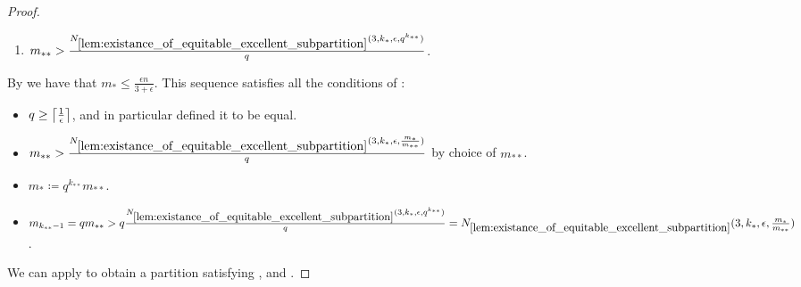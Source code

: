 \begin{theorem}[Theorem 5.18]
\begin{proof}
\begin{enumerate}[label=(\alph*), ref=\alph*]
                    \item \label{itm:minimal_conditions_for_excellent_partitions.c} $m_{**} > \frac{N_{\ref{lem:existance_of_equitable_excellent_subpartition}}
                        ( 3, k_*, \epsilon, q^{k_{**}} )}{q}$.
                \end{enumerate}
                By  we have that $m_* \leq \frac{\epsilon n}{3 + \epsilon}$.
                This sequence satisfies all the conditions of :
                \begin{itemize}[label={}]
                    \item {}
                        $q \geq \left\lceil \frac{1}{\epsilon} \right\rceil$, and in particular defined it to be equal.
                    \item {}
                            $m_{**} > \frac{N_{\ref{lem:existance_of_equitable_excellent_subpartition}}
                                ( 3, k_*, \epsilon, \frac{m_*}{m_{**}} )}{q}$ by choice of $m_{**}$.
                    \item {}
                        $m_* \coloneqq q^{k_{**}} m_{**}$.
                    \item {} $m_{k_{**}-1} = q m_{**} >
                        q \frac{N_{\ref{lem:existance_of_equitable_excellent_subpartition}}( 3, k_*, \epsilon, q^{k_{**}} )}{q} =
                        N_{\ref{lem:existance_of_equitable_excellent_subpartition}}( 3, k_*, \epsilon, \frac{m_*}{m_{**}} )$.
                \end{itemize}
                We can apply  to obtain a partition
                satisfying ,
                 and
                .


\end{proof}
\end{theorem}
